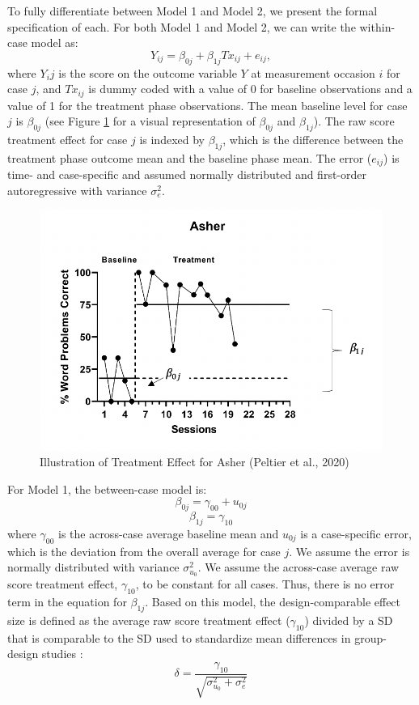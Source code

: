 \documentclass[
]{book}
\begin{document}
To fully differentiate between Model 1 and Model 2, we present the formal specification of each. For both Model 1 and Model 2, we can write the within-case model as:
\begin{equation}
\label{eq:M1M2-L1}
Y_{ij} = \beta_{0j} + \beta_{1j}Tx_{ij} + e_{ij},
\end{equation}
where \(Y_ij\) is the score on the outcome variable \(Y\) at measurement occasion \(i\) for case \(j\), and \(Tx_{ij}\) is dummy coded with a value of 0 for baseline observations and a value of 1 for the treatment phase observations. The mean baseline level for case \(j\) is \(\beta_{0j}\) (see Figure \ref{fig:Peltier-Asher-2020} for a visual representation of \(\beta_{0j}\) and \(\beta_{1j}\)). The raw score treatment effect for case \(j\) is indexed by \(\beta_{1j}\), which is the difference between the treatment phase outcome mean and the baseline phase mean. The error (\(e_{ij}\)) is time- and case-specific and assumed normally distributed and first-order autoregressive with variance \(\sigma_e^2\).

\begin{figure}
\includegraphics[width=0.75\linewidth]{images/Peltier2020_Asher} \caption{Illustration of Treatment Effect for Asher (Peltier et al., 2020)}\label{fig:Peltier-Asher-2020}
\end{figure}

For Model 1, the between-case model is:
\begin{equation}
\label{eq:M1-intercept}
\beta_{0j} = \gamma_{00} + u_{0j}
\end{equation}
\begin{equation}
\label{eq:M1-slope}
\beta_{1j} = \gamma_{10}
\end{equation}
where \(\gamma_{00}\) is the across-case average baseline mean and \(u_{0j}\) is a case-specific error, which is the deviation from the overall average for case \(j\). We assume the error is normally distributed with variance \(\sigma_{u_0}^2\). We assume the across-case average raw score treatment effect, \(\gamma_{10}\), to be constant for all cases. Thus, there is no error term in the equation for \(\beta_{1j}\). Based on this model, the design-comparable effect size is defined as the average raw score treatment effect (\(\gamma_{10}\)) divided by a SD that is comparable to the SD used to standardize mean differences in group-design studies \citep{Pustejovsky2014design}:
\begin{equation}
\label{eq:delta-M1}
\delta = \frac{\gamma_{10}}{\sqrt{\sigma_{u_0}^2 + \sigma_e^2}}
\end{equation}
\end{document}
